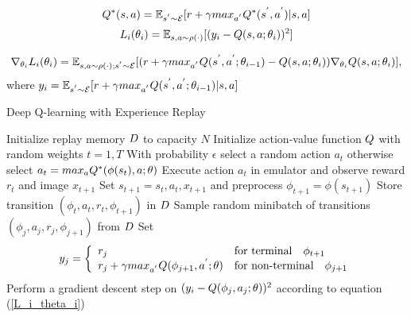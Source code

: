 \documentclass[12pt,a4paper]{article}
\begin{document}
\begin{equation}\label{Q*_s_a}
\mathnormal{Q}^{*}(s,a) = \mathbb{E}_{s^{'} \sim \mathcal{E}}[r + \gamma max_{a^{'}} \mathnormal{Q^{*}}(s^{'}, a^{'})|s, a]
\end{equation}
\begin{equation}
L_{i}(\theta_{i}) = \mathbb{E}_{s, a \sim \rho(\cdot)}[(y_{i} - \mathnormal{Q}(s, a; \theta_{i}))^{2}]
\end{equation}

\begin{equation} \label{L_i_theta_i}
\nabla_{\theta_{i}}L_{i}(\theta_{i})=\mathbb{E}_{s,a \sim \rho(\cdot); s^{'} \sim \mathcal{E}}[(r + \gamma max_{a^{'}}\mathnormal{Q}(s^{'}, a^{'}; \theta_{i-1}) - \mathnormal{Q}(s, a; \theta_{i}))\nabla_{\theta_{i}}\mathnormal{Q}(s,a; \theta_{i})],
\end{equation}
where $y_i = \mathbb{E}_{s^{'} \sim \mathcal{E}}[r + \gamma max_{a^{'}} \mathnormal{Q}(s^{'}, a^{'}; \theta_{i-1})|s,a]$

\begin{algorithm}
	\caption{Deep Q-learning with Experience Replay}
	\begin{algorithmic}                                                                                                   
		\State Initialize replay memory $\mathnormal{D}$ to capacity $N$
		\State Initialize action-value function $\mathnormal{Q}$ with random weights
			\For $t = 1, T$
				\State With probability $\epsilon$ select a random action $a_t$
				\State otherwise select $a_t = max_{a}\mathnormal{Q}^{*}(\phi(s_{t}), a; \theta)$
				\State Execute action $a_t$ in emulator and observe reward $r_{t}$ and image $x_{t+1}$
				\State Set $s_{t+1} = s_{t}, a_{t}, x_{t+1}$ and preprocess $\phi_{t+1} = \phi(s_{t+1})$
				\State Store transition $(\phi_{t}, a_{t}, r_{t}, \phi_{t+1}) $ in $\mathnormal{D}$
				\State Sample random minibatch of transitions $(\phi_{j}, a_{j}, r_{j}, \phi_{j+1})$ from $\mathnormal{D}$
				\State Set $$y_{j} = \left\{
				\begin{array}{ll}
				r_{j} & \text{for terminal} \quad \phi_{t+1} \\
				r_{j} + \gamma max_{a^{'}}\mathnormal{Q}(\phi_{j+1}, a^{'}; \theta) &  \text{for non-terminal} \quad \phi_{j+1}
				
				\end{array}\right.
				$$
				\State Perform a gradient descent step on $(y_{i} - \mathnormal{Q}(\phi_{j}, a_{j}; \theta))^{2}$ according to equation (\ref{L_i_theta_i})
			\EndFor
		\EndFor
		
	\end{algorithmic}
\end{algorithm} 
\end{document}
